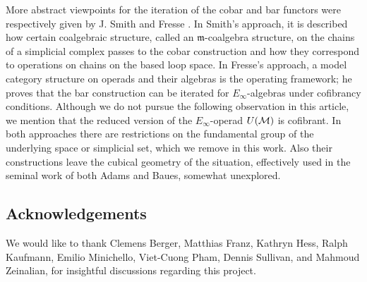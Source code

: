 More abstract viewpoints for the iteration of the cobar and bar functors were respectively given by J. Smith \cite{smith1994cobar} and Fresse \cite{fresse2010props}.
In Smith's approach, it is described how certain coalgebraic structure, called an $\mathfrak{m}$-coalgebra structure, on the chains of a simplicial complex passes to the cobar construction and how they correspond to operations on chains on the based loop space.
In Fresse's approach, a model category structure on operads and their algebras is the operating framework; he proves that the bar construction can be iterated for $E_{\infty}$-algebras under cofibrancy conditions.
Although we do not pursue the following observation in this article, we mention that the reduced version of the $E_{\infty}$-operad $U(\mathcal{M})$ is cofibrant.
In both approaches there are restrictions on the fundamental group of the underlying space or simplicial set, which we remove in this work.
Also their constructions leave the cubical geometry of the situation, effectively used in the seminal work of both Adams and Baues, somewhat unexplored.

\subsection*{Acknowledgements}

We would like to thank Clemens Berger, Matthias Franz, Kathryn Hess, Ralph Kaufmann, Emilio Minichello, Viet-Cuong Pham, Dennis Sullivan, and Mahmoud Zeinalian, for insightful discussions regarding this project.